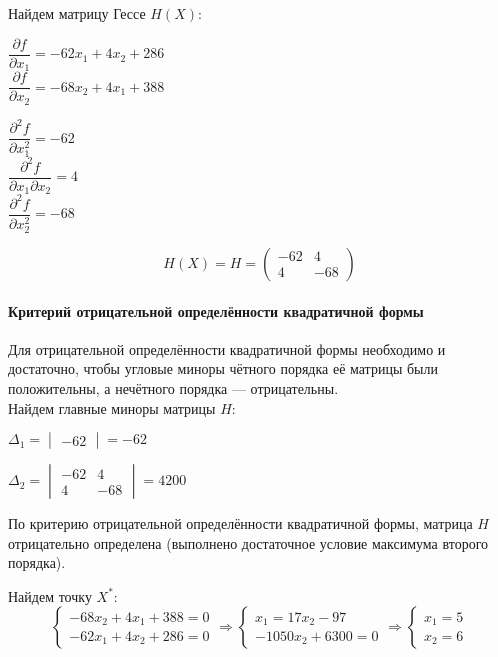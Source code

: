 Найдем матрицу Гессе $H(X)$:

\begin{multicols}{2}
	\centering
	$\dfrac{\partial f}{\partial x_1} = -62 x_1 + 4 x_2 + 286$\\
	$\dfrac{\partial f}{\partial x_2} = -68 x_2 + 4 x_1 + 388$
\end{multicols}

\begin{multicols}{3}
	\centering
	$\dfrac{\partial^2 f}{\partial x_1^2} = -62$\\
	$\dfrac{\partial^2 f}{\partial x_1 \partial x_2} = 4$\\
	$\dfrac{\partial^2 f}{\partial x_2^2} = -68$
\end{multicols}

\begin{equation*}
H(X) = H = 
\begin{pmatrix}
	-62 & 4 \\
	4 & -68
\end{pmatrix}
\end{equation*}


\paragraph{Критерий отрицательной определённости квадратичной формы} Для отрицательной определённости квадратичной формы необходимо и достаточно, чтобы угловые миноры чётного порядка её матрицы были положительны, а нечётного порядка — отрицательны.\\

Найдем главные миноры матрицы $H$:

\begin{multicols}{2}
\centering
$\Delta_1 = \begin{vmatrix} -62 \end{vmatrix} = -62$

$\Delta_2 = \begin{vmatrix}
	-62 & 4 \\
	4 & -68
\end{vmatrix} = 4200$
\end{multicols}
По критерию отрицательной определённости квадратичной формы, матрица $H$ отрицательно определена (выполнено достаточное условие максимума второго порядка). 

Найдем точку $X^*$:
\begin{equation*}
\begin{cases}
	-68 x_2 + 4 x_1 + 388 = 0 \\
	-62 x_1 + 4 x_2 + 286 = 0 
\end{cases}\Rightarrow
\begin{cases}
	x_1 = 17 x_2 - 97 \\
	-1050 x_2 + 6300 = 0
\end{cases}\Rightarrow
\begin{cases}
	x_1 = 5 \\
	x_2 = 6
\end{cases}
\end{equation*}

